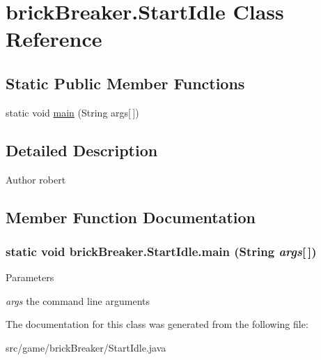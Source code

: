 \hypertarget{classbrick_breaker_1_1_start_idle}{
\section{brickBreaker.StartIdle Class Reference}
\label{classbrick_breaker_1_1_start_idle}
}
\subsection*{Static Public Member Functions}
\begin{DoxyCompactItemize}
\item 
static void \hyperlink{classbrick_breaker_1_1_start_idle_a19cd517d36d1ee07d9bf3c6a8f10e018}{main} (String args\mbox{[}$\,$\mbox{]})
\end{DoxyCompactItemize}


\subsection{Detailed Description}
\begin{DoxyAuthor}{Author}
robert 
\end{DoxyAuthor}


\subsection{Member Function Documentation}
\hypertarget{classbrick_breaker_1_1_start_idle_a19cd517d36d1ee07d9bf3c6a8f10e018}{
\subsubsection[{main}]{\setlength{\rightskip}{0pt plus 5cm}static void brickBreaker.StartIdle.main (String {\em args}\mbox{[}$\,$\mbox{]})}}
\label{classbrick_breaker_1_1_start_idle_a19cd517d36d1ee07d9bf3c6a8f10e018}

\begin{DoxyParams}{Parameters}
\item[{\em args}]the command line arguments \end{DoxyParams}


The documentation for this class was generated from the following file:\begin{DoxyCompactItemize}
\item 
src/game/brickBreaker/StartIdle.java\end{DoxyCompactItemize}
